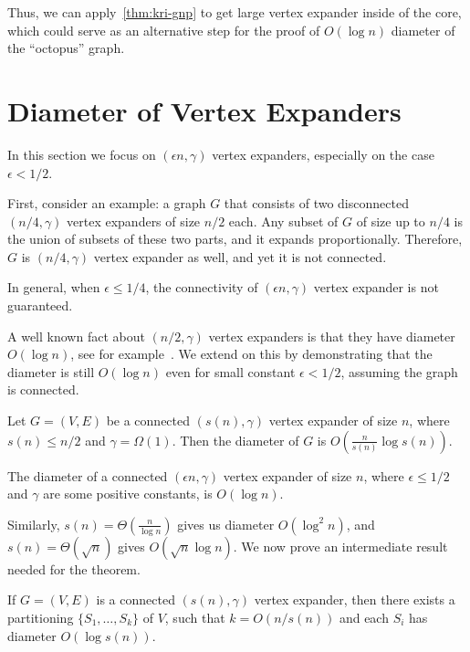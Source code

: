 Thus, we can apply~\autoref{thm:kri-gnp} to get large vertex expander inside of the core,
which could serve as an alternative step for the proof of $O(\log n)$ diameter
of the ``octopus'' graph.

\section{Diameter of Vertex Expanders}

In this section we focus on $(\epsilon n,\gamma)$ vertex expanders,
especially on the case $\epsilon<1/2$.

First, consider an example: a graph $G$ that consists of two disconnected
$(n/4,\gamma)$ vertex expanders of size $n/2$ each.
Any subset of $G$ of size up to $n/4$ is the union of subsets of these two parts,
and it expands proportionally.
Therefore, $G$ is $(n/4,\gamma)$ vertex expander as well,
and yet it is not connected.

In general, when $\epsilon\leq1/4$, the connectivity of
$(\epsilon n,\gamma)$ vertex expander is not guaranteed.

A well known fact about $(n/2,\gamma)$ vertex expanders is that
they have diameter $O(\log n)$, see for example~\cite{rao12,hlw06}.
We extend on this by demonstrating that the diameter is still $O(\log n)$
even for small constant $\epsilon<1/2$, assuming the graph is connected.

\begin{theorem}
    \label{thm:vertex-expander-diameter}
    Let $G=(V,E)$ be a connected $(s(n),\gamma)$ vertex expander of size $n$,
    where $s(n)\leq n/2$ and $\gamma=\Omega(1)$.
    Then the diameter of $G$ is $O\left(\frac{n}{s(n)}\log s(n)\right)$.
\end{theorem}

\begin{corollary}
    The diameter of a connected $(\epsilon n,\gamma)$ vertex expander of size $n$,
    where $\epsilon\leq1/2$ and $\gamma$ are some positive constants, is $O(\log n)$.
\end{corollary}

Similarly, $s(n)=\Theta\left(\frac{n}{\log n}\right)$ gives us
diameter $O\left(\log^2n\right)$,
and $s(n)=\Theta(\sqrt{n})$ gives $O\left(\sqrt{n}\log n\right)$.
We now prove an intermediate result needed for the theorem.

\begin{lemma}
    \label{lem:vertex-expander-partitioning}
    If $G=(V,E)$ is a connected $(s(n),\gamma)$ vertex expander,
    then there exists a partitioning $\{S_1,\ldots,S_k\}$ of $V$,
    such that $k=O(n/s(n))$ and each $S_i$ has diameter $O(\log s(n))$.
\end{lemma}

